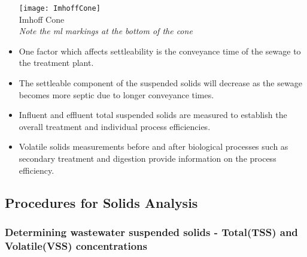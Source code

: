 \begin{itemize}
\begin{minipage}{0.5\textwidth}
			      \end{minipage}	
			      \begin{minipage}{0.5\textwidth}
			      	\begin{center}
			      		\texttt{[image: ImhoffCone]}\\
			      		Imhoff Cone\\
			      		\textit{Note the ml markings at the bottom of the cone}
			      		
			      		
			      	\end{center}
		      \end{minipage}
			      	\item One factor which affects settleability is the conveyance time of the sewage to the treatment plant. 			
			      	\item The settleable component of the suspended solids will decrease as the sewage becomes more septic due to longer conveyance times.
			\item Influent and effluent total suspended solids are measured to establish the overall treatment and individual process efficiencies.  
			\item Volatile solids measurements before and after biological processes such as secondary treatment and digestion provide information on the process efficiency.\\
		\end{itemize}


	\subsection{Procedures for Solids Analysis}
	\subsubsection{Determining wastewater suspended solids - Total(TSS) and Volatile(VSS) concentrations}			
				 
